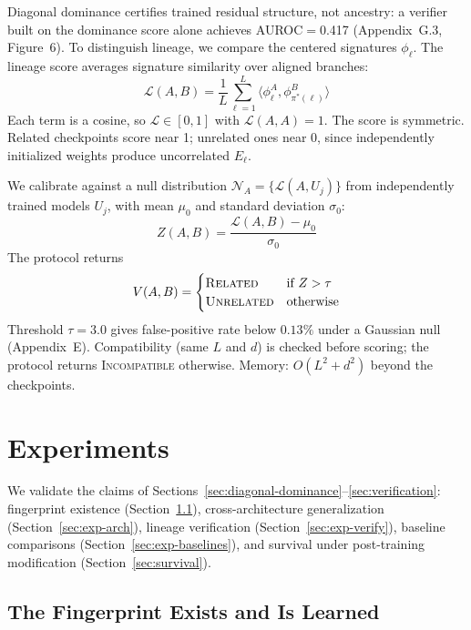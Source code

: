 \documentclass[letterpaper]{article}
\begin{document}
Diagonal dominance certifies trained residual structure, not ancestry: a verifier built on the dominance score alone achieves AUROC$=$0.417 (Appendix~G.3, Figure~6). To distinguish lineage, we compare the centered signatures $\phi_\ell$. The lineage score averages signature similarity over aligned branches:
\begin{equation}\label{eq:lineage-score}
\mathcal{L}(A, B) = \frac{1}{L} \sum_{\ell=1}^{L} \langle \phi^A_\ell, \phi^B_{\pi^*(\ell)} \rangle
\end{equation}
Each term is a cosine, so $\mathcal{L} \in [0,1]$ with $\mathcal{L}(A,A) = 1$. The score is symmetric. Related checkpoints score near 1; unrelated ones near 0, since independently initialized weights produce uncorrelated $E_\ell$.

We calibrate against a null distribution $\mathcal{N}_A = \{\mathcal{L}(A, U_j)\}$ from independently trained models $U_j$, with mean $\mu_0$ and standard deviation $\sigma_0$:
\begin{equation}\label{eq:zscore}
Z(A,B) = \frac{\mathcal{L}(A,B) - \mu_0}{\sigma_0}
\end{equation}
The protocol returns
\begin{equation}
V(A,B) = \begin{cases}
\textsc{Related} & \text{if } Z > \tau \\
\textsc{Unrelated} & \text{otherwise}
\end{cases}
\end{equation}
Threshold $\tau = 3.0$ gives false-positive rate below $0.13\%$ under a Gaussian null (Appendix~E). Compatibility (same $L$ and $d$) is checked before scoring; the protocol returns \textsc{Incompatible} otherwise. Memory: $O(L^2 + d^2)$ beyond the checkpoints.

\section{Experiments}\label{sec:experiments}

We validate the claims of Sections~\ref{sec:diagonal-dominance}--\ref{sec:verification}: fingerprint existence (Section~\ref{sec:exp-exists}), cross-architecture generalization (Section~\ref{sec:exp-arch}), lineage verification (Section~\ref{sec:exp-verify}), baseline comparisons (Section~\ref{sec:exp-baselines}), and survival under post-training modification (Section~\ref{sec:survival}).

\subsection{The Fingerprint Exists and Is Learned}\label{sec:exp-exists}
\end{document}
